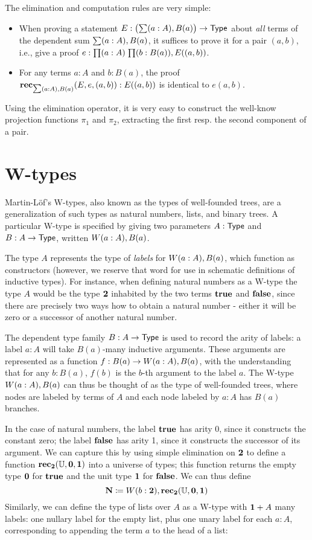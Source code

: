 The elimination and computation rules are very simple:

\begin{itemize}
\item When proving a statement $E : \big(\sm{a:A} B(a)\big) \to \type$ about \emph{all} terms of the dependent sum $\sm{a:A} B(a)$, it suffices to prove it for a pair $(a,b)$, i.e., give a proof $e : \prd{a:A}{b:B(a)} E((a,b))$.
\end{itemize}

\begin{itemize}
\item For any terms $a : A$ and $b : B(a)$, the proof $\rec_{\sm{a:A} B(a)}(E,e,(a,b)) : E((a,b))$ is identical to $e(a,b)$.
\end{itemize}
Using the elimination operator, it is very easy to construct the well-know projection functions $\pi_1$ and $\pi_2$, extracting the first resp. the second component of a pair.

\section{W-types}
Martin-L{\"o}f's W-types, also known as the types of well-founded trees, are a generalization of such types as natural numbers, lists, and binary trees. A particular W-type is specified by giving two parameters $A : \mathsf{Type}$ and $B : A \to \mathsf{Type}$, written $W(a:A), B(a)$.

The type $A$ represents the type of \emph{labels} for $W(a :A), B(a)$, which function as constructors (however, we reserve that word for use in schematic definitions of inductive types). For instance, when defining natural numbers as a W-type the type $A$ would be the type $\mathbf{2}$ inhabited by the two terms $\mathbf{true}$ and $\mathbf{false}$, since there are precisely two ways how to obtain a natural number - either it will be zero or a successor of another natural number. 

The dependent type family $B : A \to \mathsf{Type}$ is used to record the arity of labels: a label $a : A$ will take $B(a)$-many inductive arguments. These arguments are represented as a function $f : B(a) \to W(a :A), B(a)$, with the understanding that for any $b : B(a)$, $f(b)$ is the $b$-th argument to the label $a$. The W-type $W(a :A), B(a)$ can thus be thought of as the type of well-founded trees, where nodes are labeled by terms of $A$ and each node labeled by $a : A$ has $B(a)$ branches.

In the case of natural numbers, the label $\mathbf{true} $ has arity 0, since it constructs the constant zero; the label $\mathbf{false}$ has arity 1, since it constructs the successor of its argument. We can capture this by using simple elimination on $\mathbf{2}$ to define a function $\mathbf{rec}_\mathbf{2}(\mathbb{U},\mathbf{0},\mathbf{1})$ into a universe of types; this function returns the empty type $\mathbf{0}$ for $\mathbf{true}$ and the unit type $\mathbf{1}$ for $\mathbf{false}$. We can thus define
\[ \mathbf{N} \coloneqq W(b:\mathbf{2}), \mathbf{rec}_\mathbf{2}(\mathbb{U},\mathbf{0},\mathbf{1}) \]
Similarly, we can define the type of lists over $A$ as a W-type with $\mathbf{1} + A$ many labels: one nullary label for the empty list, plus one unary label for each $a : A$, corresponding to appending the term $a$ to the head of a list:

